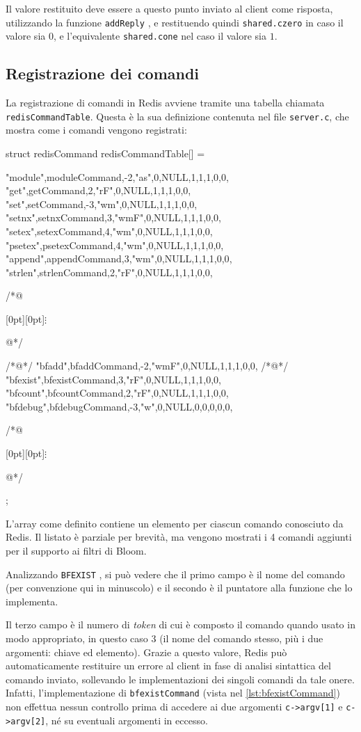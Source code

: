 Il valore restituito deve essere a questo punto inviato al client come risposta, utilizzando
la funzione \verb|addReply| , e restituendo quindi \verb|shared.czero| in caso il valore
sia $0$, e l'equivalente \verb|shared.cone| nel caso il valore sia $1$.

\subsection{Registrazione dei comandi}

La registrazione di comandi in Redis avviene tramite una tabella chiamata \verb|redisCommandTable|.
Questa è la sua definizione contenuta nel file \verb|server.c|, che mostra come i comandi vengono
registrati:

\begin{commentedsource}[style=csource,caption=Registrazione nuovi comandi nella tabella co\-man\-di,label={lst:cmdtable}]
struct redisCommand redisCommandTable[] = {
    {"module",moduleCommand,-2,"as",0,NULL,1,1,1,0,0},
    {"get",getCommand,2,"rF",0,NULL,1,1,1,0,0},
    {"set",setCommand,-3,"wm",0,NULL,1,1,1,0,0},
    {"setnx",setnxCommand,3,"wmF",0,NULL,1,1,1,0,0},
    {"setex",setexCommand,4,"wm",0,NULL,1,1,1,0,0},
    {"psetex",psetexCommand,4,"wm",0,NULL,1,1,1,0,0},
    {"append",appendCommand,3,"wm",0,NULL,1,1,1,0,0},
    {"strlen",strlenCommand,2,"rF",0,NULL,1,1,1,0,0},

/*@\centerline{\raisebox{-1pt}[0pt][0pt]{$\vdots$}}@*/

/*@\lnote@*/    {"bfadd",bfaddCommand,-2,"wmF",0,NULL,1,1,1,0,0},
/*@\lnote@*/    {"bfexist",bfexistCommand,3,"rF",0,NULL,1,1,1,0,0},
    {"bfcount",bfcountCommand,2,"rF",0,NULL,1,1,1,0,0},
    {"bfdebug",bfdebugCommand,-3,"w",0,NULL,0,0,0,0,0},

/*@\centerline{\raisebox{-1pt}[0pt][0pt]{$\vdots$}}@*/

};
\end{commentedsource}

L'array come definito contiene un elemento per ciascun comando conosciuto da Redis. Il listato è
parziale per brevità, ma vengono mostrati i 4 comandi aggiunti per il supporto ai filtri di Bloom.

Analizzando \verb|BFEXIST| , si può vedere che il primo campo è il nome del comando (per
convenzione qui in minuscolo) e il secondo è il puntatore alla funzione che lo implementa. 

Il terzo campo è il numero di \emph{token} di cui è composto il comando quando usato in modo
appropriato, in questo caso $3$ (il nome del comando stesso, più i due argomenti: chiave ed
elemento). Grazie a questo valore, Redis può automaticamente restituire un errore al client in fase
di analisi sintattica del comando inviato, sollevando le implementazioni dei singoli comandi da tale
onere. Infatti, l'implementazione di \verb|bfexistCommand| (vista nel \autoref{lst:bfexistCommand})
non effettua nessun controllo prima di accedere ai due argomenti \verb|c->argv[1]| e
\verb|c->argv[2]|, né su eventuali argomenti in eccesso.

